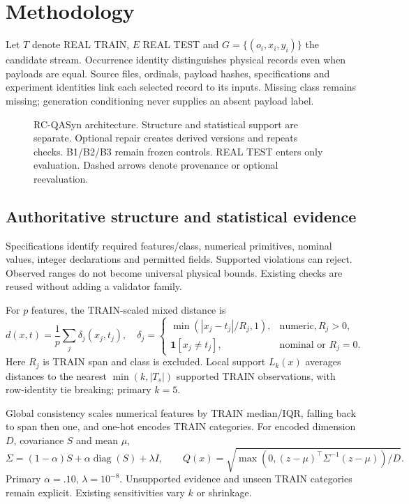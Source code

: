 \section{Methodology}
Let $T$ denote REAL TRAIN, $E$ REAL TEST and $G=\{(o_i,x_i,y_i)\}$ the candidate stream. Occurrence identity distinguishes physical records even when payloads are equal. Source files, ordinals, payload hashes, specifications and experiment identities link each selected record to its inputs. Missing class remains missing; generation conditioning never supplies an absent payload label.

\begin{figure}[p]\centering
\caption{RC-QASyn architecture. Structure and statistical support are separate. Optional repair creates derived versions and repeats checks. B1/B2/B3 remain frozen controls. REAL TEST enters only evaluation. Dashed arrows denote provenance or optional reevaluation.}\label{fig:architecture}\end{figure}

\subsection{Authoritative structure and statistical evidence}
Specifications identify required features/class, numerical primitives, nominal values, integer declarations and permitted fields. Supported violations can reject. Observed ranges do not become universal physical bounds. Existing checks are reused without adding a validator family.

For $p$ features, the TRAIN-scaled mixed distance is
\begin{equation}
d(x,t)=\frac1p\sum_j\delta_j(x_j,t_j),\quad
\delta_j=\begin{cases}\min(|x_j-t_j|/R_j,1),&\text{numeric},R_j>0,\\
\mathbf1[x_j\ne t_j],&\text{nominal or }R_j=0.
\end{cases}
\end{equation}
Here $R_j$ is TRAIN span and class is excluded. Local support $L_k(x)$ averages distances to the nearest $\min(k,|T_s|)$ supported TRAIN observations, with row-identity tie breaking; primary $k=5$.

Global consistency scales numerical features by TRAIN median/IQR, falling back to span then one, and one-hot encodes TRAIN categories. For encoded dimension $D$, covariance $S$ and mean $\mu$,
\begin{equation}
\Sigma=(1-\alpha)S+\alpha\operatorname{diag}(S)+\lambda I,\qquad
Q(x)=\sqrt{\max(0,(z-\mu)^\top\Sigma^{-1}(z-\mu))/D}.
\end{equation}
Primary $\alpha=.10$, $\lambda=10^{-8}$. Unsupported evidence and unseen TRAIN categories remain explicit. Existing sensitivities vary $k$ or shrinkage.


